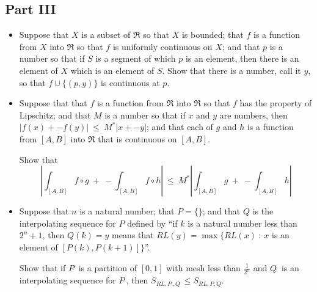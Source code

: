 \documentclass{article}
\begin{document}
\subsection*{Part III}

\begin{itemize}

  \item[1.] Suppose that $X$ is a subset of $\Re$ so that $X$ is bounded; that $f$ is a function from $X$ into $\Re$ so that $f$ is uniformly continuous on $X$; and that $p$ is a number so that if $S$ is a segment of which $p$ is an element, then there is an element of $X$ which is an element of $S$. Show that there is a number, call it $y$, so that $f \cup \{ (p,y) \}$ is continuous at $p$.
  
  \item[2.] Suppose that that $f$ is a function from $\Re$ into $\Re$ so that $f$ has the property of Lipschitz; and that $M$ is a number so that if $x$ and $y$ are numbers, then $|f(x) + - f(y)| \ \leq \ M^* |x + -y|$; and that each of $g$ and $h$ is a function from $[A,B]$ into $\Re$ that is continuous on $[A,B]$.
  
    Show that
    \begin{equation*}
      \left| \int_{[A,B]} f \circ g \ + \ - \int_{[A,B]} f \circ h \right| 
      \ \leq \ M^* \left| \int_{[A,B]} g \ + \ - \int_{[A,B]} h \right|
    \end{equation*}
  
  \item[3.] Suppose that $n$ is a natural number; that $P = \{ \}$; and that $Q$ is the interpolating sequence for $P$ defined by ``if $k$ is a natural number less than $2^n + 1$, then $Q(k) = y$ means that $RL(y) = \max \{ RL(x)\ :\ x$ is an element of $[P(k), P(k+1)] \}$''.
  
    Show that if $P\hat{\ }$ is a partition of $[0,1]$ with mesh less than $\frac{1}{2^n}$ and $Q\hat{\ }$ is an interpolating sequence for $P\hat{\ }$, then $S_{ RL, P\hat{\ }, Q\hat{\ } } \leq S_{RL, P, Q}$.
  
\end{itemize}
\end{document}
